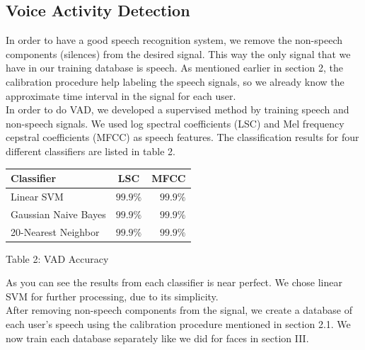 \documentclass{article}
\begin{document}
\subsection{Voice Activity Detection}
In order to have a good speech recognition system, we remove the non-speech components (silences) from the desired signal. This way the only signal that we have in our training database is speech. As mentioned earlier in section 2, the calibration procedure help labeling the speech signals, so we already know the approximate time interval in the signal for each user. \\
In order to do VAD, we developed a supervised method by training speech and non-speech signals. We used log spectral coefficients (LSC) and Mel frequency cepstral coefficients (MFCC) as speech features. The classification results for four different classifiers are listed in table 2. \\
\begin{center}
\begin{tabular}{ | l|c | r| }
\hline
Classifier & LSC & MFCC \\ \hline
Linear SVM & $99.9\%$ & $99.9\%$ \\ \hline
Gaussian Naive Bayes & $99.9\%$ & $ 99.9\%$ \\ \hline
20-Nearest Neighbor & $99.9\%$ & $ 99.9\%$ \\ \hline
\end{tabular}
\end{center}\centerline{Table 2: VAD Accuracy}
\centerline{}
As you can see the results from each classifier is near perfect. We chose linear SVM for further processing, due to its simplicity. 
\\ After removing non-speech components from the signal, we create a database of each user's speech using the calibration procedure mentioned in section 2.1. We now train each database separately like we did for faces in section III. 
\end{document}
